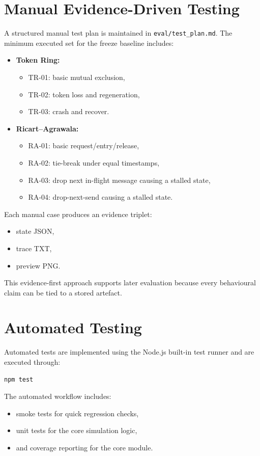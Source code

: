 \section{Manual Evidence-Driven Testing}
A structured manual test plan is maintained in \texttt{eval/test\_plan.md}. The minimum executed set for the freeze baseline includes:
\begin{itemize}
  \item \textbf{Token Ring:}
    \begin{itemize}
      \item TR-01: basic mutual exclusion,
      \item TR-02: token loss and regeneration,
      \item TR-03: crash and recover.
    \end{itemize}
  \item \textbf{Ricart--Agrawala:}
    \begin{itemize}
      \item RA-01: basic request/entry/release,
      \item RA-02: tie-break under equal timestamps,
      \item RA-03: drop next in-flight message causing a stalled state,
      \item RA-04: drop-next-send causing a stalled state.
    \end{itemize}
\end{itemize}

Each manual case produces an evidence triplet:
\begin{itemize}
  \item state JSON,
  \item trace TXT,
  \item preview PNG.
\end{itemize}

This evidence-first approach supports later evaluation because every behavioural claim can be tied to a stored artefact.

\section{Automated Testing}
Automated tests are implemented using the Node.js built-in test runner and are executed through:
\begin{verbatim}
npm test
\end{verbatim}

The automated workflow includes:
\begin{itemize}
  \item smoke tests for quick regression checks,
  \item unit tests for the core simulation logic,
  \item and coverage reporting for the core module.
\end{itemize}

